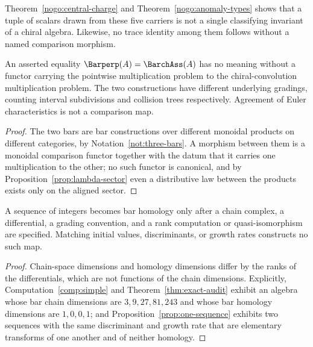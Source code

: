 Theorem~\ref{nogo:central-charge} and
Theorem~\ref{nogo:anomaly-types} shows that a tuple of scalars drawn from
these five carriers is not a single classifying invariant of a chiral
algebra.  Likewise, no trace identity among them follows without a named
comparison morphism.

\begin{theorem}
\label{nogo:unnamed-bar-comparison}
\StatusProved{} An asserted equality $\Barperp(A)=\BarchAss(A)$ has no
meaning without a functor carrying the pointwise multiplication problem to
the chiral-convolution multiplication problem. The two constructions have
different underlying gradings, counting interval subdivisions and
collision trees respectively. Agreement of Euler characteristics is not a
comparison map.
\end{theorem}

\begin{proof}
The two bars are bar constructions over different monoidal products on
different categories, by Notation~\ref{not:three-bars}. A morphism between
them is a monoidal comparison functor together with the datum that it
carries one multiplication to the other; no such functor is canonical, and
by Proposition~\ref{prop:lambda-sector} even a distributive law between
the products exists only on the aligned sector.
\end{proof}

\begin{theorem}
\label{nogo:scalar-sequence}
\StatusProved{} A sequence of integers becomes bar homology only after a
chain complex, a differential, a grading convention, and a rank
computation or quasi-isomorphism are specified. Matching initial values,
discriminants, or growth rates constructs no such map.
\end{theorem}

\begin{proof}
Chain-space dimensions and homology dimensions differ by the ranks of the
differentials, which are not functions of the chain dimensions. Explicitly,
Computation~\ref{comp:simple} and Theorem~\ref{thm:exact-audit} exhibit an
algebra whose bar chain dimensions are $3,9,27,81,243$ and whose bar
homology dimensions are $1,0,0,1$; and
Proposition~\ref{prop:one-sequence} exhibits two sequences with the same
discriminant and growth rate that are elementary transforms of one another
and of neither homology.
\end{proof}
